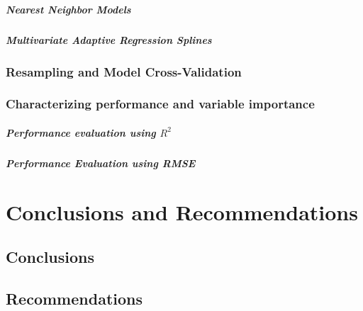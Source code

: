 \documentclass[letterpaper,12pt,titlepage,oneside,final]{report}
\begin{document}
                \paragraph {Nearest Neighbor Models}
                \paragraph {Multivariate Adaptive Regression Splines}
            \subsection {Resampling and Model Cross-Validation}
            \subsection{Characterizing performance and variable importance}
                \paragraph {Performance evaluation using $R^2$}
                \paragraph {Performance Evaluation using RMSE}

\chapter{Conclusions and Recommendations}
    \section{Conclusions}
    \section{Recommendations}


\nocite{*}

\cleardoublepage %
\renewcommand*{\bibname}{References}
\end{document}
